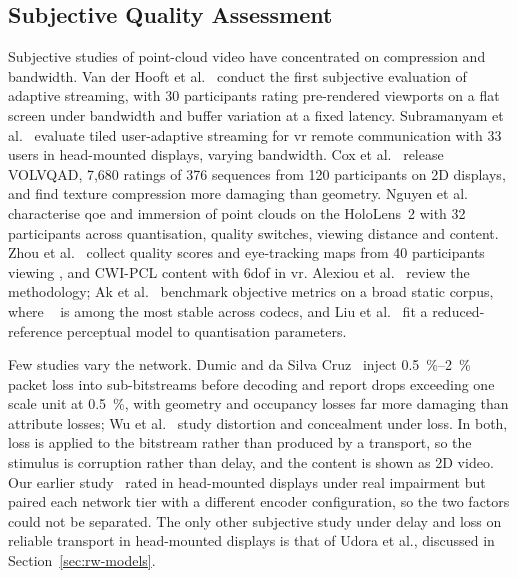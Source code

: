 \subsection{Subjective Quality Assessment}
\label{sec:rw-subjective}

Subjective studies of point-cloud video have concentrated on
compression and bandwidth. Van der Hooft et al.~\cite{vanderhooft2020qomex}
conduct the first subjective evaluation of adaptive \vpcc streaming,
with 30 participants rating pre-rendered viewports on a flat screen
under bandwidth and buffer variation at a fixed latency. Subramanyam
et al.~\cite{subramanyam2022} evaluate tiled user-adaptive streaming
for \gls{vr} remote communication with 33 users in head-mounted
displays, varying bandwidth. Cox et al.~\cite{Cox2023} release VOLVQAD,
7,680 ratings of 376 \vpcc sequences from 120 participants on 2D
displays, and find texture compression more damaging than geometry.
Nguyen et al.~\cite{nguyen2023} characterise \gls{qoe} and immersion of
\vpcc point clouds on the HoloLens~2 with 32 participants across
quantisation, quality switches, viewing distance and content. Zhou et
al.~\cite{zhou2025tomm} collect quality scores and eye-tracking maps
from 40 participants viewing \vpcc, \gpcc and CWI-PCL content with
\gls{6dof} in \gls{vr}. Alexiou et al.~\cite{Alexiou2023} review the
methodology; Ak et al.~\cite{ak2024basics} benchmark objective metrics
on a broad static corpus, where \pcqm~\cite{pcqm} is among the most
stable across codecs, and Liu et al.~\cite{liu2021tip} fit a
reduced-reference perceptual model to \vpcc quantisation parameters.

Few studies vary the network. Dumic and da Silva Cruz~\cite{dumic2023}
inject \SIrange{0.5}{2}{\percent} packet loss into \vpcc sub-bitstreams
before decoding and report \mos drops exceeding one scale unit at
\SI{0.5}{\percent}, with geometry and occupancy losses far more
damaging than attribute losses; Wu et al.~\cite{wu2021nossdav} study
distortion and concealment under loss. In both, loss is applied to the
bitstream rather than produced by a transport, so the stimulus is
corruption rather than delay, and the content is shown as 2D video.
Our earlier study~\cite{mosaic2026} rated \vpcc in head-mounted
displays under real \quic impairment but paired each network tier with
a different encoder configuration, so the two factors could not be
separated. The only other subjective study under delay and loss on
reliable transport in head-mounted displays is that of Udora et al.,
discussed in Section~\ref{sec:rw-models}.

